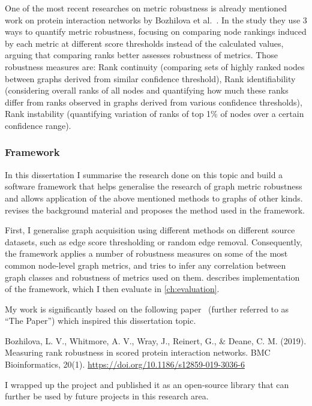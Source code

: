 One of the most recent researches on metric robustness is already mentioned work on protein interaction networks by Bozhilova et al.~\cite{Bozhilova2019}.
In the study they use 3 ways to quantify metric robustness, focusing on comparing node rankings induced by each metric at different score thresholds instead of the calculated values, arguing that comparing ranks better assesses robustness of metrics.
Those robustness measures are: Rank continuity (comparing sets of highly ranked nodes between graphs derived from similar confidence threshold), Rank identifiability (considering overall ranks of all nodes and quantifying how much these ranks differ from ranks observed in graphs derived from various confidence thresholds), Rank instability (quantifying variation of ranks of top 1\% of nodes over a certain confidence range).

\subsubsection*{Framework}


In this dissertation I summarise the research done on this topic and build a software framework that helps generalise the research of graph metric robustness and allows application of the above mentioned methods to graphs of other kinds.
 revises the background material and proposes the method used in the framework.

First, I generalise graph acquisition using different methods on different source datasets, such as edge score thresholding or random edge removal.
Consequently, the framework applies a number of robustness measures on some of the most common node-level graph metrics, and tries to infer any correlation between graph classes and robustness of metrics used on them.
 describes implementation of the framework, which I then evaluate in \cref{ch:evaluation}.


My work is significantly based on the following paper~\cite{Bozhilova2019} (further referred to as ``The Paper'') which inspired this dissertation topic.
\begin{adjustwidth}{1cm}{}
    \vspace*{0.5em}
    Bozhilova, L. V., Whitmore, A. V., Wray, J., Reinert, G., \& Deane, C. M. (2019). Measuring rank robustness in scored protein interaction networks. BMC Bioinformatics, 20(1). \url{https://doi.org/10.1186/s12859-019-3036-6}
    \vspace*{0.5em}
\end{adjustwidth}

I wrapped up the project and published it as an open-source library that can further be used by future projects in this research area.

